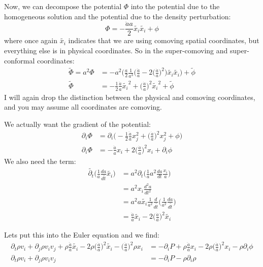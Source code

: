 \documentclass{article}
\newcommand{ \wt }{\widetilde}
\begin{document}
Now, we can decompose the potential $\Phi$ into the potential due to the homogeneous solution and the potential due to the density perturbation:
\begin{equation}
  \Phi = -\frac{\ddot{a}a}{2} \wt{x_i}\wt{x_i} + \phi
\end{equation}
where once again $\wt{x_i}$ indicates that we are using comoving spatial coordinates, but everything else is in physical coordinates.  So in the super-comoving and super-conformal coordinates:
\begin{align*} 
  \wt{\Phi} = a^{2}\Phi &=- a^{2} \bigg( \frac{a}{2}\frac{1}{a^3} \bigg( \frac{\ddot{a}}{a}  - 2 \bigg( \frac{\dot{a}}{a}\bigg)^2\bigg)  \wt{x_i}\wt{x_i}\bigg) + \wt{\phi} \\
  \wt{\Phi} &= -\frac{1}{2} \frac{\ddot{a}}{a}\wt{x_i}^2 +\bigg(\frac{\dot{a}}{a}\bigg)^2\wt{x_i}^2 +\wt{\phi} 
\end{align*}
I will again drop the distinction between the physical and comoving coordinates, and you may assume all coordinates are comoving.

We actually want the gradient of the potential:
\begin{align*}
  \partial_i \Phi &= \partial_i \bigg( -\frac{1}{2} \frac{\ddot{a}}{a}x_j^2 +\bigg(\frac{\dot{a}}{a}\bigg)^2x_j^2 +\phi \bigg)\\
  \partial_i \Phi &= -\frac{\ddot{a}}{a} x_i + 2 \bigg(\frac{\dot{a}}{a}  \bigg)^2 x_i + \partial_i \phi
\end{align*}
We also need the term:
\begin{align*}
 \wt{ \partial_t}\bigg( \frac{1}{a}\frac{da}{d\wt{t}} \wt{x_i} \bigg) &= a^2 \partial_t \bigg( \frac{1}{a} a^2 \frac{da}{dt} \frac{x_i}{a} \bigg)\\
&=a^2 x_i \frac{d^2a}{dt^2} \\
&= a^2 a \wt{x_i} \frac{1}{a^2} \frac{d}{d\wt{t}}\bigg( \frac{1}{a^2} \frac{da}{d\wt{t}} \bigg) \\
&= \frac{\ddot{a}}{a} \wt{x_i} - 2 \bigg( \frac{\dot{a}}{a} \bigg)^2 \wt{x_i} 
\end{align*}


Lets put this into the Euler equation and we find:
\begin{align*}
\partial_t \rho v_i + \partial_j \rho v_i v_j + \rho
  \frac{\ddot{a}}{a} \wt{x_i} - 2 \rho \bigg( \frac{\dot{a}}{a}
  \bigg)^2 \wt{x_i}  - \bigg( \frac{\dot{a}}{a} \bigg)^2 \rho x_i 
 &= - \partial_i P +\rho\frac{\ddot{a}}{a} x_i  -
   2\rho\bigg(\frac{\dot{a}}{a}\bigg)^2x_i-\rho \partial_i \phi\\
\partial_t \rho v_i + \partial_j \rho v_i v_j &= -\partial_i P -
                                                \rho \partial_i \rho
\end{align*}
\end{document}
